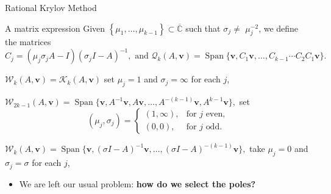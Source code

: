 \documentclass[aspectratio=169,xcolor=dvipsnames]{beamer}
\begin{document}
	\begin{frame}{Rational Krylov Method}
\begin{block}{A matrix expression}
	Given $\left\{ \mu _{1},\dots, \mu _{k-1}\right\} \subset \overline{\mathbb{C}}$
	such that $\sigma _{j}\neq $ $\mu _{j}^{-2}$, we define the matrices
	\begin{equation*}
		C_{j}=\left( \mu _{j}\sigma _{j}A-I\right) (\sigma _{j}I-A)^{-1}, \text{ and } \mathcal{Q}_{k}(A,\mathbf{v})=\operatorname{Span}\{\mathbf{v},C_{1}\mathbf{v}%
		,\ldots ,C_{k-1}\cdots C_2 C_{1}\mathbf{v}\}.
	\end{equation*}
\end{block}

\begin{description}
	\item<1->[Polynomial Krylov] $\mathcal{W}_{k}(A,\mathbf{v})=\mathcal{K}_{k}(A,%
	\mathbf{v})$ set $\mu _{j}=1$ and $\sigma
	_{j}=\infty $ for each $j$,
	\item<2->[Extended Krylov] $\mathcal{W}_{2k-1}(A,\mathbf{v})=\operatorname{Span}\{\mathbf{v}, A^{-1}%
	\mathbf{v}, A\mathbf{v}, \ldots, A^{-(k-1)}\mathbf{v}, A^{k-1}%
	\mathbf{v}\},$ set
	\begin{equation*}
		(\mu _j,\sigma_j)= \left\lbrace \begin{array}{ll}
			(1,\infty), & \mbox{for  $j$ even},\\
			(0,0),  & \mbox{for  $j$  odd.}
		\end{array}\right.
	\end{equation*}
	\item<3->[Shift-And-Invert] $\mathcal{W}_{k}(A,\mathbf{v})=\operatorname{Span}\{\mathbf{v},(\sigma
	I-A)^{-1}\mathbf{v},\ldots ,(\sigma I-A)^{-(k-1)}\mathbf{v}\},$ take $\mu _{j}=0$ and $\sigma _{j}=\sigma $ for each $j$,
\end{description}
\begin{itemize}
	\item[\faHammer]<4-> We are left our usual problem: \alert{\textbf{how do we select the poles?}}
\end{itemize}

	\end{frame}
\end{document}
